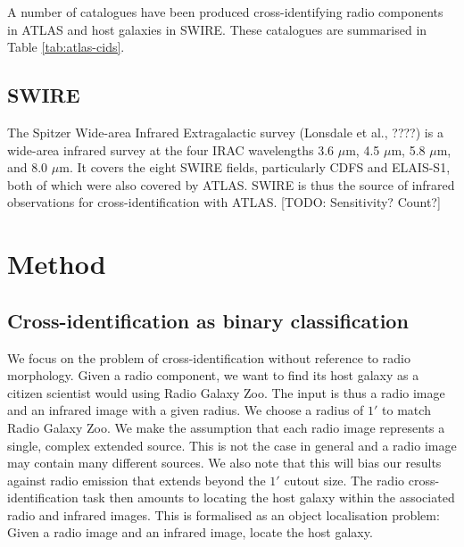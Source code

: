 \documentclass[fleqn,usenatbib,usedcolumn]{mnras}
\begin{document}
    A number of catalogues have been produced cross-identifying radio components
    in ATLAS and host galaxies in SWIRE. These catalogues are summarised in
    Table \ref{tab:atlas-cids}.



  \subsection{SWIRE}\label{sec:swire}

    The Spitzer Wide-area Infrared Extragalactic survey (Lonsdale et al.,
    ????) is a wide-area infrared survey at the four IRAC wavelengths 3.6
    $\mu$m, 4.5 $\mu$m, 5.8 $\mu$m, and 8.0 $\mu$m. It covers the eight SWIRE fields,
    particularly CDFS and ELAIS-S1, both of which were also covered by
    ATLAS. SWIRE is thus the source of infrared observations for
    cross-identification with ATLAS. [TODO: Sensitivity? Count?]

  \section{Method}\label{method}

  \subsection{Cross-identification as binary
  classification}\label{cross-identification-as-binary-classification}

    We focus on the problem of cross-identification without reference to radio
    morphology. Given a radio component, we want to find its host galaxy as a
    citizen scientist would using Radio Galaxy Zoo. The input is thus a radio
    image and an infrared image with a given radius. We choose a radius of
    $1'$ to match Radio Galaxy Zoo. We make the assumption that each radio
    image represents a single, complex extended source. This is not the case
    in general and a radio image may contain many different sources. We also
    note that this will bias our results against radio emission that extends
    beyond the $1'$ cutout size. The radio cross-identification task then
    amounts to locating the host galaxy within the associated radio and
    infrared images. This is formalised as an object localisation problem:
    Given a radio image and an infrared image, locate the host galaxy.
\end{document}
